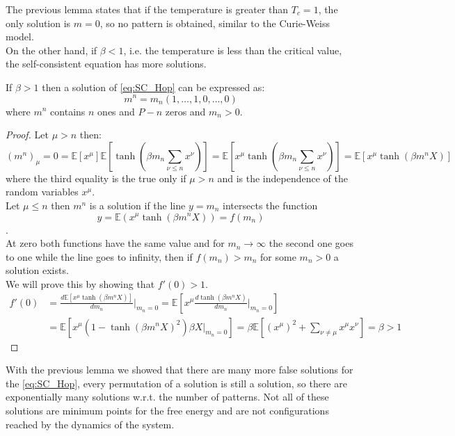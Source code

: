 The previous lemma states that if the temperature is greater than $T_c = 1$, the only solution is $m=0$, so no pattern is obtained, similar to the Curie-Weiss model.\\
On the other hand, if $\beta < 1$, i.e. the temperature is less than the critical value, the self-consistent equation has more solutions.
\begin{lemma}
    If $\beta > 1$ then a solution of \cref{eq:SC_Hop} can be expressed as:
    \[
    m^n= m_n(1,\ldots,1,0,\ldots,0)
    \]
    where $m^n$ contains $n$ ones and $P-n$ zeros and $m_n>0$.
    \begin{proof}
    	Let $\mu >n $ then:
    	\[
    	(m^n)_\mu = 0 = \mathbb{E}\left[x^\mu\right]\mathbb{E}\left[\tanh\left(\beta m_n \sum_{\nu \leq n} x^\nu\right)\right] =  \mathbb{E}\left[x^\mu \tanh\left(\beta m_n \sum_{\nu \leq n} x^\nu\right)\right] = \mathbb{E}\left[x^\mu \tanh\left(\beta m^n X\right)\right]
    	\]
    	where the third equality is the true only if $\mu >n$ and is the independence of the random variables $x^\mu$.\\
    	Let $\mu \leq n$ then $m^n$ is a solution if the line $y = m_n$ intersects the function $$y =  \mathbb{E}(x^\mu \tanh(\beta m^n X))=f(m_n)$$. \\
    	At zero both functions have the same value and for $m_n \to \infty$ the second one goes to one while the line goes to infinity, then if $f(m_n) > m_n$ for some $m_n >0$ a solution exists.\\
    	We will prove this by showing that $f'(0) > 1$.
    	\begin{align*}
    		f'(0) &= \frac{d\mathbb{E}\left[x^\mu \tanh\left(\beta m^n X\right)\right]}{dm_n} \big|_{m_n=0} = \mathbb{E}\left[x^\mu \frac{d \tanh\left(\beta m^n X\right)}{dm_n} \big|_{m_n=0} \right] \\
    		&= \mathbb{E}\left[x^\mu  \left(1 - \tanh\left(\beta m^n X\right)^2 \right) \beta X \big|_{m_n=0} \right] =\beta  \mathbb{E}\left[\left(x^\mu\right)^2 + \sum_{\nu \neq \mu } x^\mu x^\nu \right] = \beta > 1
    	\end{align*}
    \end{proof}
\end{lemma}
With the previous lemma we showed that there are many more false solutions for the \cref{eq:SC_Hop}, every permutation of a solution is still a solution, so there are exponentially many solutions w.r.t. the number of patterns. Not all of these solutions are minimum points for the free energy and are not configurations reached by the dynamics of the system.
